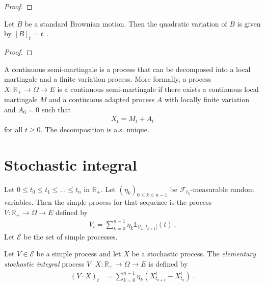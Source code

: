 \begin{proof}

\end{proof}


\begin{lemma}\label{lem:quadraticVariation_brownian}
Let $B$ be a standard Brownian motion. Then the quadratic variation of $B$ is given by $[B]_t = t$~.
\end{lemma}

\begin{proof}

\end{proof}


\begin{definition}\label{def:continuousSemiMartingale}
A continuous semi-martingale is a process that can be decomposed into a local martingale and a finite variation process.
More formally, a process $X : \mathbb{R}_+ \to \Omega \to E$ is a continuous semi-martingale if there exists a continuous local martingale $M$ and a continuous adapted process $A$ with locally finite variation and $A_0 = 0$ such that
\begin{align*}
  X_t = M_t + A_t
\end{align*}
for all $t \ge 0$.
The decomposition is a.s. unique.
\end{definition}


\section{Stochastic integral}


\begin{definition}\label{def:simpleProcess}
  \leanok
Let $0 \le t_0 \le t_1 \le \ldots \le t_n$ in $\mathbb{R}_+$.
Let $(\eta_k)_{0 \le k \le n-1}$ be $\mathcal{F}_{t_k}$-measurable random variables.
Then the simple process for that sequence is the process $V : \mathbb{R}_+ \to \Omega \to E$ defined by
\begin{align*}
  V_t = \sum_{k=0}^{n-1} \eta_k \mathbb{1}_{(t_k, t_{k+1}]}(t)
  \: .
\end{align*}
Let $\mathcal{E}$ be the set of simple processes.
\end{definition}


\begin{definition}\label{def:elemStochIntegral}
  \leanok
Let $V \in \mathcal{E}$ be a simple process and let $X$ be a stochastic process.
The \emph{elementary stochastic integral} process $V \cdot X : \mathbb{R}_+ \to \Omega \to E$ is defined by
\begin{align*}
  (V \cdot X)_t
  &= \sum_{k=0}^{n-1} \eta_k (X^t_{t_{k+1}} - X^t_{t_k})
  \: .
\end{align*}
\end{definition}


